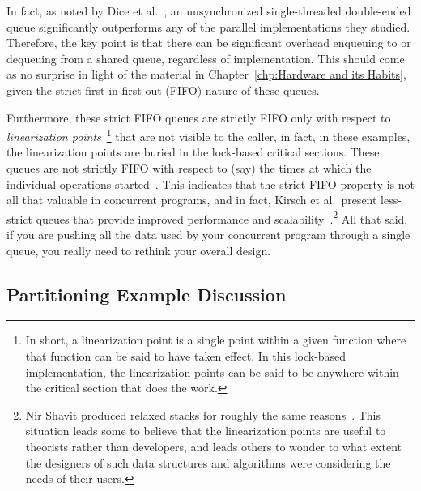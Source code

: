 \QuickQuizEnd

In fact, as noted by Dice et al.~\cite{DavidDice:2010:SCA:HTM:deque},
an unsynchronized single-threaded double-ended queue significantly
outperforms any of the parallel implementations they studied.
Therefore, the key point is that there can be significant overhead enqueuing to
or dequeuing from a shared queue, regardless of implementation.
This should come as no surprise in light of the material in
Chapter~\ref{chp:Hardware and its Habits}, given the strict
first-in-first-out (FIFO) nature of these queues.

Furthermore, these strict FIFO queues are strictly FIFO only with
respect to
\emph{linearization points}~\cite{Herlihy:1990:LCC:78969.78972}\footnote{
	In short, a linearization point is a single point within a given
	function where that function can be said to have taken effect.
	In this lock-based implementation, the linearization points
	can be said to be anywhere within the critical section that
	does the work.}
that are not visible to the caller, in fact, in these examples,
the linearization points are buried in the lock-based critical
sections.
These queues are not strictly FIFO with respect to (say) the times at which
the individual operations started~\cite{AndreasHaas2012FIFOisnt}.
This indicates that the strict FIFO property is not all that valuable
in concurrent programs, and in fact, Kirsch et al.\ present less-strict
queues that provide improved performance and
scalability~\cite{ChristophMKirsch2012FIFOisntTR}.\footnote{
	Nir Shavit produced relaxed stacks for roughly the same
	reasons~\cite{Shavit:2011:DSM:1897852.1897873}.
	This situation leads some to believe that the linearization
	points are useful to theorists rather than developers, and
	leads others to wonder to what extent the designers of such
	data structures and algorithms were considering the needs
	of their users.}
All that said, if you are pushing all the data used by your concurrent
program through a single queue, you really need to rethink your
overall design.

\subsection{Partitioning Example Discussion}
\label{sec:SMPdesign:Partitioning Example Discussion}

